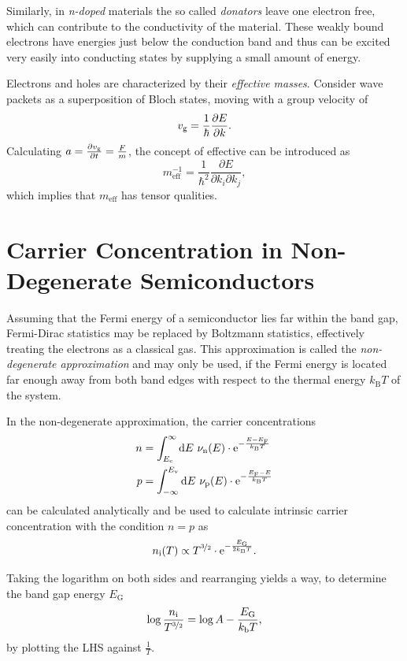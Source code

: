 Similarly, in \textit{n-doped} materials the so called \textit{donators} leave one electron free, which can contribute to the conductivity of the material.
These weakly bound electrons have energies just below the conduction band and thus can be excited very easily into conducting states by supplying a small amount of energy.

Electrons and holes are characterized by their \textit{effective masses}.
Consider wave packets as a superposition of Bloch states, moving with a group velocity of
\begin{equation*}
	v_\text{g} = \frac{1}{\hbar}\frac{\partial E}{\partial k}.
\end{equation*}
Calculating $a=\frac{\partial v_\text{g}}{\partial t} = \frac{F}{m}$, the concept of effective can be introduced as
\begin{equation*}
	m_\text{eff}^{-1} = \frac{1}{\hbar^2}\frac{\partial E}{\partial k_i \partial k_j},
\end{equation*}
which implies that $m_\text{eff}$ has tensor qualities.

\section{Carrier Concentration in Non-Degenerate Semiconductors}
Assuming that the Fermi energy of a semiconductor lies far within the band gap, Fermi-Dirac statistics may be replaced by Boltzmann statistics, effectively treating the electrons as a classical gas.
This approximation is called the \textit{non-degenerate approximation} and may only be used, if the Fermi energy is located far enough away from both band edges with respect to the thermal energy $k_\text{B}T$ of the system.

In the non-degenerate approximation, the carrier concentrations
\begin{align*}
	n &= \int_{E_\text{c}}^\infty\d E\ \nu_\text{n}(E)\cdot\e^{-\frac{E-E_\text{F}}{k_\text{B}T}} \\
	p &= \int_{-\infty}^{E_\text{v}}\d E\ \nu_\text{p}(E)\cdot\e^{-\frac{E_\text{F}-E}{k_\text{B}T}}
\end{align*}
can be calculated analytically and be used to calculate intrinsic carrier concentration with the condition $n=p$ as
\begin{equation*}
	n_\text{i}(T) \propto T^{\nicefrac{3}{2}}\cdot\mathrm{e}^{-\frac{E_\text{G}}{2k_\text{B}T}}.
\end{equation*}

Taking the logarithm on both sides and rearranging yields a way, to determine the band gap energy $E_\text{G}$
\begin{equation*}
	\log{\frac{n_\text{i}}{T^{\nicefrac{3}{2}}}} = \log{A} - \frac{E_\text{G}}{k_\text{b}T},
\end{equation*}
by plotting the LHS against $\frac{1}{T}$.

